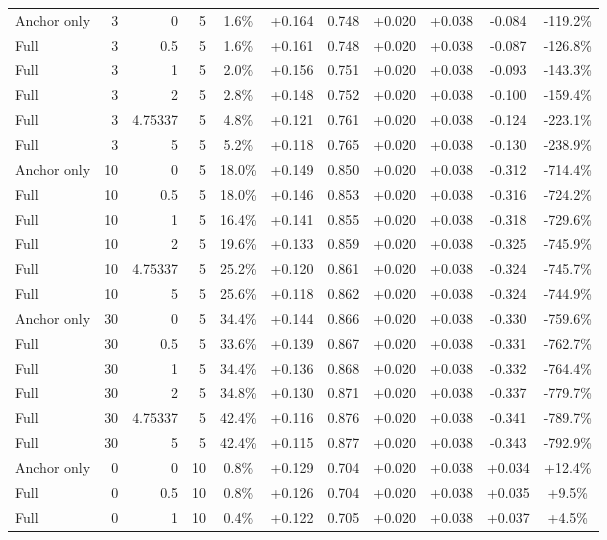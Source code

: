 \begin{table}[htbp]
\begin{tabular}{lrrrccccccc}
Anchor only & 3 & 0 & 5 & 1.6\% & +0.164 & 0.748 & +0.020 & +0.038 & -0.084 & -119.2\% \\
Full & 3 & 0.5 & 5 & 1.6\% & +0.161 & 0.748 & +0.020 & +0.038 & -0.087 & -126.8\% \\
Full & 3 & 1 & 5 & 2.0\% & +0.156 & 0.751 & +0.020 & +0.038 & -0.093 & -143.3\% \\
Full & 3 & 2 & 5 & 2.8\% & +0.148 & 0.752 & +0.020 & +0.038 & -0.100 & -159.4\% \\
Full & 3 & 4.75337 & 5 & 4.8\% & +0.121 & 0.761 & +0.020 & +0.038 & -0.124 & -223.1\% \\
Full & 3 & 5 & 5 & 5.2\% & +0.118 & 0.765 & +0.020 & +0.038 & -0.130 & -238.9\% \\
Anchor only & 10 & 0 & 5 & 18.0\% & +0.149 & 0.850 & +0.020 & +0.038 & -0.312 & -714.4\% \\
Full & 10 & 0.5 & 5 & 18.0\% & +0.146 & 0.853 & +0.020 & +0.038 & -0.316 & -724.2\% \\
Full & 10 & 1 & 5 & 16.4\% & +0.141 & 0.855 & +0.020 & +0.038 & -0.318 & -729.6\% \\
Full & 10 & 2 & 5 & 19.6\% & +0.133 & 0.859 & +0.020 & +0.038 & -0.325 & -745.9\% \\
Full & 10 & 4.75337 & 5 & 25.2\% & +0.120 & 0.861 & +0.020 & +0.038 & -0.324 & -745.7\% \\
Full & 10 & 5 & 5 & 25.6\% & +0.118 & 0.862 & +0.020 & +0.038 & -0.324 & -744.9\% \\
Anchor only & 30 & 0 & 5 & 34.4\% & +0.144 & 0.866 & +0.020 & +0.038 & -0.330 & -759.6\% \\
Full & 30 & 0.5 & 5 & 33.6\% & +0.139 & 0.867 & +0.020 & +0.038 & -0.331 & -762.7\% \\
Full & 30 & 1 & 5 & 34.4\% & +0.136 & 0.868 & +0.020 & +0.038 & -0.332 & -764.4\% \\
Full & 30 & 2 & 5 & 34.8\% & +0.130 & 0.871 & +0.020 & +0.038 & -0.337 & -779.7\% \\
Full & 30 & 4.75337 & 5 & 42.4\% & +0.116 & 0.876 & +0.020 & +0.038 & -0.341 & -789.7\% \\
Full & 30 & 5 & 5 & 42.4\% & +0.115 & 0.877 & +0.020 & +0.038 & -0.343 & -792.9\% \\
Anchor only & 0 & 0 & 10 & 0.8\% & +0.129 & 0.704 & +0.020 & +0.038 & +0.034 & +12.4\% \\
Full & 0 & 0.5 & 10 & 0.8\% & +0.126 & 0.704 & +0.020 & +0.038 & +0.035 & +9.5\% \\
Full & 0 & 1 & 10 & 0.4\% & +0.122 & 0.705 & +0.020 & +0.038 & +0.037 & +4.5\% \\

\end{tabular}
\end{table}
